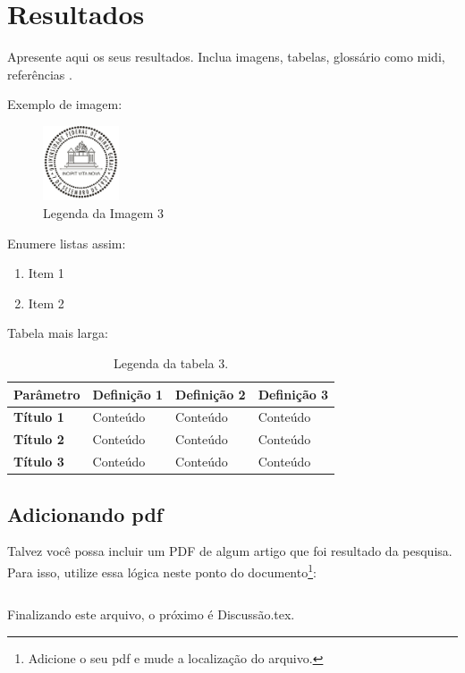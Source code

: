 \setlength{\parskip}{1.5pt}
\chapter[Resultados]{Resultados}


Apresente aqui os seus resultados. Inclua imagens, tabelas, glossário como \gls{midi}, referências \cite{article}.



Exemplo de imagem: 
\begin{figure}[h]
    \centering
\includegraphics[width=0.2\textwidth]{arquivos/pre-texto/Logo_UFMG.png}
    \caption{Legenda da Imagem 3}
    \label{fig3}
\end{figure}

Enumere listas assim:
\begin{enumerate}
    \item Item 1
    \item Item 2
\end{enumerate}

Tabela mais larga:
\begin{table}[h!]
    \centering
    \begin{tabularx}{\textwidth}{|l|X|X|X|}
        \hline
        \textbf{Parâmetro} & \textbf{Definição 1} & \textbf{Definição 2} & \textbf{Definição 3} \\ \hline
        \textbf{Título 1}  & Conteúdo & Conteúdo & Conteúdo \\ \hline
        \textbf{Título 2}  & Conteúdo & Conteúdo & Conteúdo \\ \hline
        \textbf{Título 3}  & Conteúdo & Conteúdo & Conteúdo \\ \hline
        
    \end{tabularx}
    \caption{Legenda da tabela 3.}
    \label{tab:nometabela3}
\end{table}


\section{Adicionando pdf}
Talvez você possa incluir um PDF de algum artigo que foi resultado da pesquisa. Para isso, utilize essa lógica neste ponto do documento\footnote{Adicione o seu pdf e mude a localização do arquivo.}:

\begin{listing}[h!]
    \centering
    \begin{verbatim}

    \end{verbatim}
    \caption{Exemplo \LaTeX}
    \label{lst:codigo-latex}
\end{listing}


Finalizando este arquivo, o próximo é Discussão.tex.

